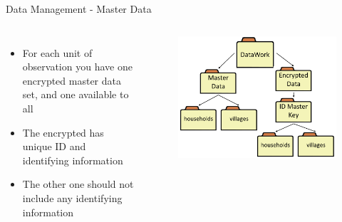 \documentclass[aspectratio=169]{beamer}
\begin{document}
\begin{frame}[fragile]{Data Management - Master Data}
	\begin{columns}[c]	
		
		\begin{itemize}
			\item For each unit of observation you have one encrypted master data set, and one available to all
			\item The encrypted has unique ID and identifying information
			\item The other one should not include any identifying information
		\end{itemize}
	
		\begin{figure}
			\centering
			\includegraphics[width=\linewidth]{img/datamanage1}
		\end{figure}
	\end{columns}
\end{frame}
\end{document}
